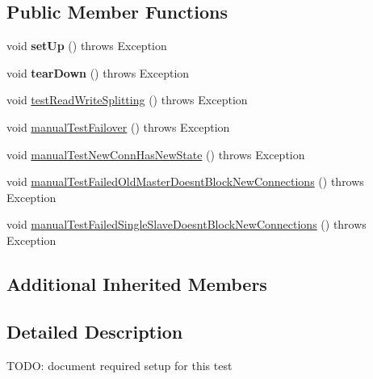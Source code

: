 \subsection*{Public Member Functions}
\begin{DoxyCompactItemize}
\item 
\mbox{\label{classtestsuite_1_1fabric_1_1jdbc_1_1_test_h_a_basics_a7aa5897ac268e034ecbfd14875be8990}} 
void {\bfseries set\+Up} ()  throws Exception 
\item 
\mbox{\label{classtestsuite_1_1fabric_1_1jdbc_1_1_test_h_a_basics_a5da87d14850b9c0c358c1cb26d1b134b}} 
void {\bfseries tear\+Down} ()  throws Exception 
\item 
void \mbox{\hyperlink{classtestsuite_1_1fabric_1_1jdbc_1_1_test_h_a_basics_a7403ca8813b62ba5c1107ab80bed7f02}{test\+Read\+Write\+Splitting}} ()  throws Exception 
\item 
void \mbox{\hyperlink{classtestsuite_1_1fabric_1_1jdbc_1_1_test_h_a_basics_ad06678b5e9617e9471be5b2e4d4f1699}{manual\+Test\+Failover}} ()  throws Exception 
\item 
void \mbox{\hyperlink{classtestsuite_1_1fabric_1_1jdbc_1_1_test_h_a_basics_a46bc7c088ffa04246b0cf08add9694d6}{manual\+Test\+New\+Conn\+Has\+New\+State}} ()  throws Exception 
\item 
void \mbox{\hyperlink{classtestsuite_1_1fabric_1_1jdbc_1_1_test_h_a_basics_ab66fc4203073df03c09bf9ab9c08b5dc}{manual\+Test\+Failed\+Old\+Master\+Doesnt\+Block\+New\+Connections}} ()  throws Exception 
\item 
void \mbox{\hyperlink{classtestsuite_1_1fabric_1_1jdbc_1_1_test_h_a_basics_a8f2267e44add804694f5e99500bdc455}{manual\+Test\+Failed\+Single\+Slave\+Doesnt\+Block\+New\+Connections}} ()  throws Exception 
\end{DoxyCompactItemize}
\subsection*{Additional Inherited Members}


\subsection{Detailed Description}
T\+O\+DO\+: document required setup for this test 


